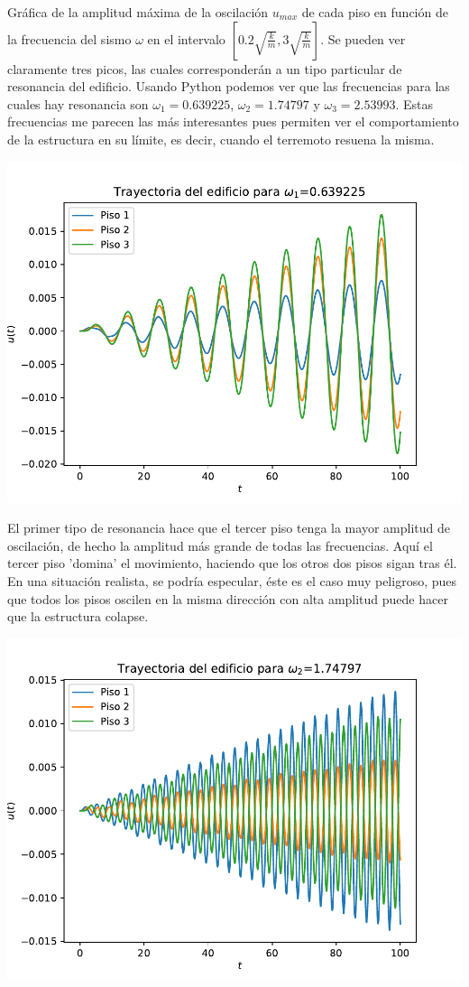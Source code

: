 \documentclass[11pt,letterpaper]{exam}
\begin{document}
Gráfica de la amplitud máxima de la oscilación $u_{max}$ de cada piso en función de la frecuencia del sismo $\omega$ en el intervalo $\left[0.2\sqrt{\frac{k}{m}},3\sqrt{\frac{k}{m}} \right]$. Se pueden ver claramente tres picos, las cuales corresponderán a un tipo particular de resonancia del edificio. Usando Python podemos ver que las frecuencias para las cuales hay resonancia son $\omega_1=0.639225$, $\omega_2=1.74797$ y $\omega_3=2.53993$. Estas frecuencias me parecen las más interesantes pues permiten ver el comportamiento de la estructura en su límite, es decir, cuando el terremoto resuena la misma.
\begin{center}
\includegraphics[width=14cm]{3_Edificio_omega1.pdf}
\end{center}
El primer tipo de resonancia hace que el tercer piso tenga la mayor amplitud de oscilación, de hecho la amplitud más grande de todas las frecuencias. Aquí el tercer piso 'domina' el movimiento, haciendo que los otros dos pisos sigan tras él. En una situación realista, se podría especular, éste es el caso muy peligroso, pues que todos los pisos oscilen en la misma dirección con alta amplitud puede hacer que la estructura colapse.
\begin{center}
\includegraphics[width=14cm]{3_Edificio_omega2.pdf}
\end{center}
\end{document}
